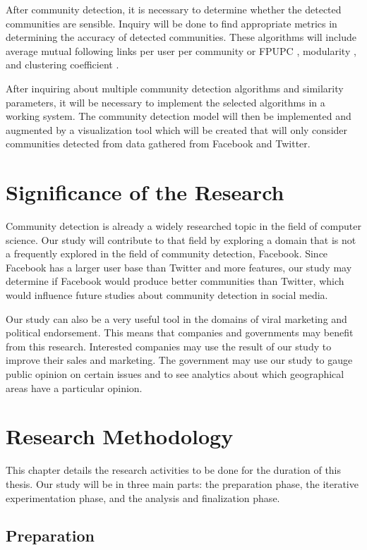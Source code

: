 After community detection, it is necessary to determine whether the detected communities are sensible. Inquiry will be done to find appropriate metrics in determining the accuracy of detected communities. These algorithms will include average mutual following links per user per community or FPUPC \cite{Zhang:2012}, modularity \cite{Deitrick:2013}, and clustering coefficient \cite{Lim:2012:1}.

After inquiring about multiple community detection algorithms and similarity parameters, it will be necessary to implement the selected algorithms in a working system. The community detection model will then be implemented and augmented by a visualization tool which will be created that will only consider communities detected from data gathered from Facebook and Twitter.

\section{Significance of the Research}
\label{sec:significance}

Community detection is already a widely researched topic in the field of computer science. Our study will contribute to that field by exploring a domain that is not a frequently explored in the field of community detection, Facebook. Since Facebook has a larger user base than Twitter and more features, our study may determine if Facebook would produce better communities than Twitter, which would influence future studies about community detection in social media.

Our study can also be a very useful tool in the domains of viral marketing and political endorsement. This means that companies and governments may benefit from this research. Interested companies may use the result of our study to improve their sales and marketing. The government may use our study to gauge public opinion on certain issues and to see analytics about which geographical areas have a particular opinion. 

\section{Research Methodology}
This chapter details the research activities to be done for the duration of this thesis. Our study will be in three main parts: the preparation phase, the iterative experimentation phase, and the analysis and finalization phase.

\subsection{Preparation}

